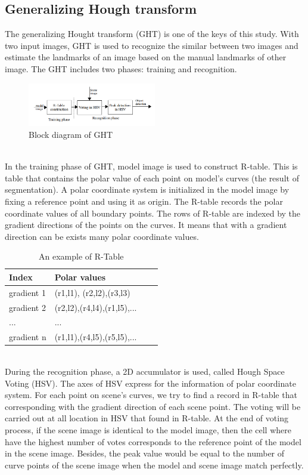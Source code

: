 \documentclass[twoside,twocolumn,10pt]{article}
\begin{document}
\subsection{Generalizing Hough transform}
The generalizing Hought transform (GHT)\cite{Ballard} is one of the keys of this study. With two input images, GHT is used to recognize the similar between two images and estimate the landmarks of an image based on the manual landmarks of other image. The GHT includes two phases: training and recognition.\\[0.2cm]
\begin{figure}[htb]
    \centering
    \includegraphics[width=0.5\textwidth]{./images/ghtdiagram}
    \caption{Block diagram of GHT}
    \label{fig:box}
\end{figure}~\\
In the training phase of GHT, model image is used to construct R-table. This is table that contains the polar value of each point on model's curves (the result of segmentation). A polar coordinate system is initialized in the model image by fixing a reference point and using it as origin. The R-table records the polar coordinate values of all boundary points. The rows of R-table are indexed by the gradient directions of the points on the curves. It means that with a gradient direction can be exists many polar coordinate values.
\begin{table}[htb]
	\centering
	\begin{tabular}{|l|l|l|l|}
	\hline
	Index & Polar values \\
	\hline
	gradient 1 & (r1,l1), (r2,l2),(r3,l3) \\
	\hline
	gradient 2 & (r2,l2),(r4,l4),(r1,l5),... \\
	\hline
	... & ...\\
	\hline
	gradient n & (r1,l1),(r4,l5),(r5,l5),... \\
	\hline
	\end{tabular}
	\caption{An example of R-Table}
\end{table}\\
During the recognition phase, a 2D accumulator is used, called Hough Space Voting (HSV). The axes of HSV express for the information of polar coordinate system. For each point on scene's curves, we try to find a record in R-table that corresponding with the gradient direction of each scene point. The voting will be carried out at all location in HSV that found in R-table. At the end of voting process, if the scene image is identical to the model image, then the cell where have the highest number of votes corresponds to the reference point of the model in the scene image. Besides, the peak value would be equal to the number of curve points of the scene image when the model and scene image match perfectly.
\end{document}

